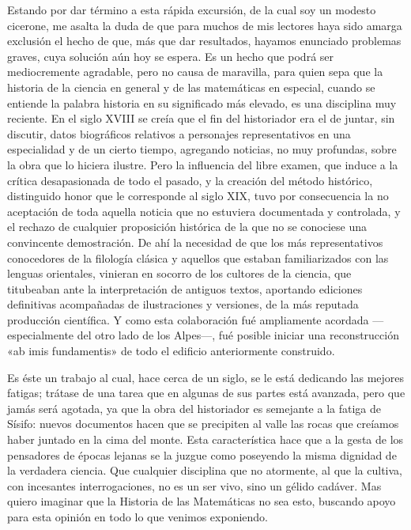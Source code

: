 \documentclass[a4paper, 12pt, draft]{article}
\begin{document}
{Estando por dar término a esta rápida excursión, de la cual soy un modesto cicerone, me asalta la duda de que para muchos de mis lectores haya sido amarga exclusión el hecho de que, más que dar resultados, hayamos enunciado problemas graves, cuya solución aún hoy se espera. Es un hecho que podrá ser mediocremente agradable, pero no causa de maravilla, para quien sepa que la historia de la ciencia en general y de las matemáticas en especial, cuando se entiende la palabra historia en su significado más elevado, es una disciplina muy reciente. En el siglo XVIII se creía que el fin del historiador era el de juntar, sin discutir, datos biográficos relativos a personajes representativos en una especialidad y de un cierto tiempo, agregando noticias, no muy profundas, sobre la obra que lo hiciera ilustre. Pero la influencia del libre examen, que induce a la crítica desapasionada de todo el pasado, y la creación del método histórico, distinguido honor que le corresponde al siglo XIX, tuvo por consecuencia la no aceptación de toda aquella noticia que no estuviera documentada y controlada, y el rechazo de cualquier proposición histórica de la que no se conociese una convincente demostración. De ahí la necesidad de que los más
representativos conocedores de la filología
clásica
y aquellos que estaban familiarizados con las lenguas orientales, vinieran en socorro de los cultores
de la ciencia, que titubeaban ante la interpretación
de antiguos textos, aportando ediciones definitivas acompañadas de ilustraciones y versiones, de la más reputada producción científica. Y como esta colaboración fué ampliamente acordada ---especialmente del otro lado de los Alpes---, fué posible iniciar una reconstrucción «ab imis fundamentis» de todo el edificio anteriormente construido.

Es éste un trabajo al cual, hace cerca de un siglo, se le está dedicando las mejores fatigas; trátase de una tarea que en algunas de sus partes está avanzada, pero que jamás será agotada, ya que la obra del historiador es semejante  a la fatiga de
Sísifo: nuevos documentos hacen 
que se precipiten 
al valle las rocas que creíamos haber juntado en la cima del monte. Esta característica hace que a la gesta de los pensadores de épocas lejanas se la juzgue como poseyendo la misma dignidad de la verdadera ciencia. Que cualquier disciplina que no atormente, al que la cultiva, con incesantes interrogaciones, no es un ser vivo, sino un gélido cadáver. Mas quiero imaginar que la Historia de las Matemáticas no sea esto, buscando apoyo para esta opinión en todo lo que venimos exponiendo.



}
\end{document}
